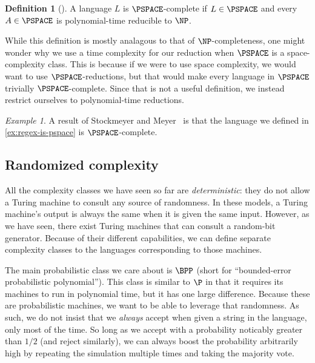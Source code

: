 \documentclass[english,12pt]{reedthesis}
\theoremstyle{plain}
\theoremstyle{definition}
\newtheorem{defn}[defn]{Definition}
\theoremstyle{remark}
\newtheorem{example}{Example}[thm]
\begin{document}
\begin{defn}[{\cite[Def.\ 8.8]{Sip97}}]\label{def:pspace-complete}
  A language $L$ is $\PSPACE$-complete if $L \in \PSPACE$ and every $A \in \PSPACE$
  is polynomial-time reducible to $\NP$.
\end{defn}

While this definition is mostly analagous to that of $\NP$-completeness, one
might wonder why we use a time complexity for our reduction when $\PSPACE$ is a
space-complexity class. This is because if we were to use space complexity, we
would want to use $\PSPACE$-reductions, but that would make every language in
$\PSPACE$ trivially $\PSPACE$-complete. Since that is not a useful definition,
we instead restrict ourselves to polynomial-time reductions.

\begin{example}
  A result of Stockmeyer and Meyer~\cite{SM73} is that the language we defined
  in \cref{ex:regex-is-pspace} is $\PSPACE$-complete.
\end{example}

\subsection{Randomized complexity}\label{sec:rand-complexity}

All the complexity classes we have seen so far are \emph{deterministic}: they do
not allow a Turing machine to consult any source of randomness. In these models,
a Turing machine's output is always the same when it is given the same input.
However, as we have seen, there exist Turing machines that can consult a
random-bit generator. Because of their different capabilities, we can define
separate complexity classes to the languages corresponding to those machines.

The main probabilistic class we care about is $\BPP$ (short for ``bounded-error
probabilistic polynomial''). This class is similar to $\P$ in that it requires
its machines to run in polynomial time, but it has one large difference. Because
these are probabilistic machines, we want to be able to leverage that
randomness. As such, we do not insist that we \emph{always} accept when given a
string in the language, only most of the time. So long as we accept with a
probability noticably greater than $1/2$ (and reject similarly), we can always
boost the probability arbitrarily high by repeating the simulation multiple
times and taking the majority vote.
\end{document}
